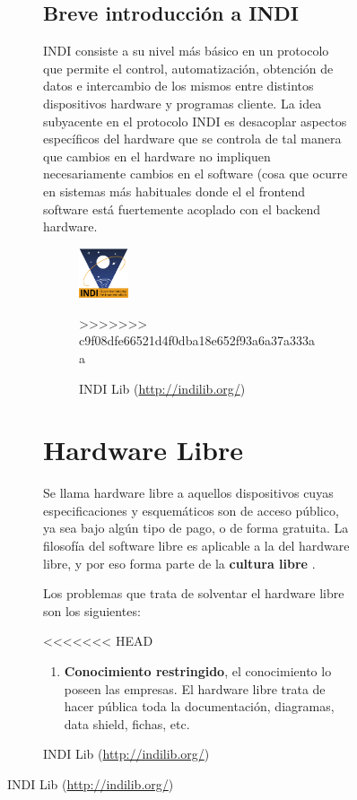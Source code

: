 \begin{itemize}
\begin{itemize}
\begin{figure}[h]
\begin{figure}[h]
\bigskip

\subsection{Breve introducción a INDI}

INDI consiste a su nivel más básico en un protocolo que permite el control, automatización, obtención de datos e intercambio de los mismos entre distintos dispositivos hardware y programas cliente. La idea subyacente en el protocolo INDI es desacoplar aspectos específicos del hardware que se controla de tal manera que cambios en el hardware no impliquen necesariamente cambios en el software (cosa que ocurre en sistemas más habituales donde el el frontend software está fuertemente acoplado con el backend hardware.

\bigskip
\begin{figure}[!ht]
	\begin{center}
		\includegraphics[width=0.21\textwidth]{../images/indi.png}
		\caption[INDI Logo]{INDI Lib (\href{http://indilib.org/}{http://indilib.org/})}
		\label{fig:ascom}
	\end{center}
>>>>>>> c9f08dfe66521d4f0dba18e652f93a6a37a333aa
\end{figure}


\section{Hardware Libre}

Se llama hardware libre a aquellos dispositivos cuyas especificaciones y esquemáticos son de acceso público, ya sea bajo algún tipo de pago, o de forma gratuita. La filosofía del software libre es aplicable a la del hardware libre, y por eso forma parte de la \textbf{cultura libre} \cite{HWLIBRE}.


Los problemas que trata de solventar el hardware libre son los siguientes:

<<<<<<< HEAD
\begin{enumerate}
	\setlength\itemsep{0.2em}
	\item \textbf{Conocimiento restringido}, el conocimiento lo poseen las empresas. El hardware libre trata de hacer pública toda la documentación, diagramas, data shield, fichas, etc.


\end{enumerate}
\end{figure}
\end{figure}
\end{itemize}
\end{itemize}
